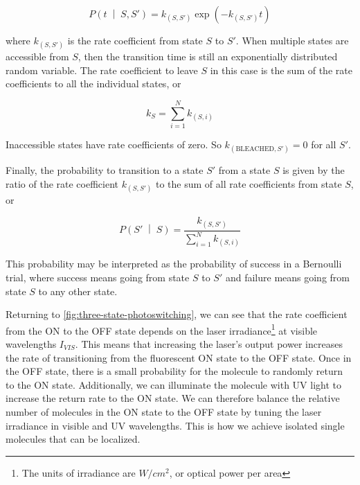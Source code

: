 \documentclass[10pt,a4paper]{book}
\newcommand{\given}{\;\middle|\;}
\begin{document}
\begin{equation}
    P \left(t \given S, S' \right) = k_{ \left( S, S' \right)} \exp \left( -k_{ \left( S, S' \right) } t \right)
\end{equation}

\noindent where $k_{ \left( S, S' \right)}$ is the rate coefficient from state $S$ to $S'$. When multiple states are accessible from $S$, then the transition time is still an exponentially distributed random variable. The rate coefficient to leave $S$ in this case is the sum of the rate coefficients to all the individual states, or

\begin{equation}
    k_S = \sum_{i = 1}^N k_{ \left( S, i \right) }
\end{equation}

\noindent Inaccessible states have rate coefficients of zero. So $k_{\left( \text{BLEACHED}, S' \right)} = 0$ for all $S'$.

Finally, the probability to transition to a state $S'$ from a state $S$ is given by the ratio of the rate coefficient $k_{ \left( S, S'\right)}$ to the sum of all rate coefficients from state $S$, or

\begin{equation}
    P \left(S' \given S \right) = \frac{k_{\left( S, S' \right)}}{\sum_{i = 1}^N k_{ \left( S, i \right) }}
\end{equation}

\noindent This probability may be interpreted as the probability of success in a Bernoulli trial, where success means going from state $S$ to $S'$ and failure means going from state $S$ to any other state.

Returning to \autoref{fig:three-state-photoswitching}, we can see that the rate coefficient from the ON to the OFF state depends on the laser irradiance\footnote{The units of irradiance are $W / cm^2$, or optical power per area} at visible wavelengths $I_{VIS}$. This means that increasing the laser's output power increases the rate of transitioning from the fluorescent ON state to the OFF state. Once in the OFF state, there is a small probability for the molecule to randomly return to the ON state. Additionally, we can illuminate the molecule with UV light to increase the return rate to the ON state. We can therefore balance the relative number of molecules in the ON state to the OFF state by tuning the laser irradiance in visible and UV wavelengths. This is how we achieve isolated single molecules that can be localized.
\end{document}
